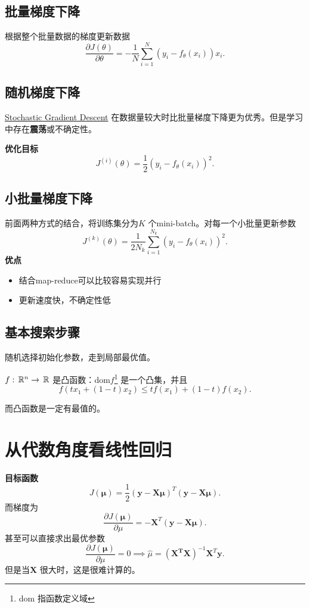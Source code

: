 \subsection{批量梯度下降}
根据整个批量数据的梯度更新数据
\[
		\frac{\partial J\left( \theta \right) }{\partial \theta} =
		-\frac{1}{N} \sum_{i=1}^{N} \left( y_{i}-f_{\theta}\left( x_{i} \right)  \right) x_{i}
.\] 

\subsection{随机梯度下降}
\href{https://en.wikipedia.org/wiki/Stochastic_gradient_descent}{Stochastic Gradient Descent} 
在数据量较大时比批量梯度下降更为优秀。但是学习中存在\textbf{震荡}或不确定性。 

\noindent \textbf{优化目标}
\[
		J^{(i)} \left( \theta \right) = \frac{1}{2} \left( y_{i}-f_{\theta}\left( x_{i} \right)   \right) ^2 
.\] 
\subsection{小批量梯度下降}
前面两种方式的结合，将训练集分为$K$ 个mini-batch。对每一个小批量更新参数
\[
		J^{(k)}\left( \theta \right)  = \frac{1}{2N_{k}} \sum_{i=1}^{N_k} \left( y_i-f_{\theta}\left( x_{i} \right)  \right) ^2
.\] 
\noindent \textbf{优点}
\begin{itemize}
		\item 结合map-reduce可以比较容易实现并行
		\item 更新速度快，不确定性低
\end{itemize}

\subsection{基本搜索步骤}
随机选择初始化参数，走到局部最优值。

\begin{defi}
		$f:\,\mathbb{R}^{n}\to \,\mathbb{R}$ 是凸函数：$\mathrm{dom} f$\footnote{dom 指函数定义域} 是一个凸集，并且
		\[
				f\left( tx_1+\left( 1-t \right) x_2 \right) \le  tf\left( x_1 \right) 
				+ \left( 1-t \right) f\left( x_2 \right) 
		.\] 
\end{defi}
而凸函数是一定有最值的。

\section{从代数角度看线性回归}
\noindent \textbf{目标函数} 
\[
		J\left( \bm{\mu}  \right) = \frac{1}{2} \left( \bm{y} - \bm{X\mu} \right)^{T} 
 \left( \bm{y} - \bm{X\mu} \right)
.\]
而梯度为
\[
		\frac{\partial J(\bm{\mu} )}{\partial \mu} 
		= - \bm{X}^{T} \left( \bm{y}-\bm{X\mu} \right) 
.\] 
甚至可以直接求出最优参数
\[
		\frac{\partial J(\bm{\mu} )}{\partial \mu} = 0 \implies \hat{\mu} = \left( \bm{X^{T}X} \right) ^{-1} \bm{X}^{T} \bm{y}
.\] 
但是当$\bm{X}$ 很大时，这是很难计算的。

